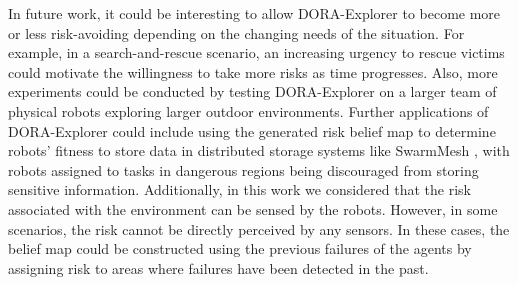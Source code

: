\documentclass[letterpaper, 10 pt, conference]{ieeeconf}
\begin{document}
In future work, it could be interesting to allow DORA-Explorer to become more
or less risk-avoiding depending on the changing needs of the
situation. For example, in a search-and-rescue scenario, an increasing
urgency to rescue victims could motivate the willingness to take more
risks as time progresses. Also, more experiments could be conducted by
testing DORA-Explorer on a larger team of physical robots exploring
larger outdoor environments. Further applications of DORA-Explorer could
include using the generated risk belief map to determine robots'
fitness to store data in distributed storage systems like SwarmMesh
\cite{majcherczykSwarmmesh2020}, with robots assigned to tasks in
dangerous regions being discouraged from storing sensitive
information. Additionally, in this work we considered that the risk
associated with the environment can be sensed by the robots. However,
in some scenarios, the risk cannot be directly perceived by any
sensors. In these cases, the belief map could be constructed using the
previous failures of the agents by assigning risk to areas where
failures have been detected in the past.




\end{document}
